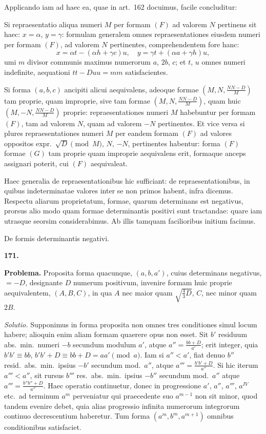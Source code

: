 \documentclass[12pt,a4paper]{article}
\theoremstyle{plain}
\begin{document}
Applicando iam ad haec ea, quae in art.~162 docuimus, facile concluditur:

Si repraesentatio aliqua numeri $M$ per formam $(F)$ ad valorem $N$ pertinens sit haec: $x = \alpha$, $y = \gamma$: formulam generalem omnes repraesentationes eiusdem numeri per formam $(F)$, ad valorem $N$ pertinentes, comprehendentem fore hanc:
\[
x = \alpha t - (\alpha h + \gamma c)u, \quad y = \gamma t + (\alpha a + \gamma h)u,
\]
umi $m$ divisor communis maximus numerorum $a$, $2b$, $c$; et $t$, $u$ omnes numeri indefinite, aequationi $tt - Duu = mm$ satisfacientes.

Si forma $(a,b,c)$ ancipiti alicui aequivalens, adeoque formae $(M,N,\frac{NN-D}{M})$ tam proprie, quam improprie, sive tam formae $(M,N,\frac{NN-D}{M})$, quam huic $(M,-N,\frac{NN-D}{M})$ proprie: repraesentationes numeri $M$ habebuntur per formam $(F)$, tam ad valorem $N$, quam ad valorem $-N$ pertinentes. Et vice versa si plures repraesentationes numeri $M$ per eandem formam $(F)$ ad valores oppositos expr.~$\sqrt{D} \pmod{M}$, $N$, $-N$, pertinentes habentur: forma $(F)$ formae $(G)$ tam proprie quam improprie aequivalens erit, formaque anceps assignari poterit, cui $(F)$ aequivaleat.

Haec generalia de repraesentationibus hic sufficiant: de repraesentationibus, in quibus indeterminatae valores inter se non primos habent, infra dicemus. Respectu aliarum proprietatum, formae, quarum determinans est negativus, prorsus alio modo quam formae determinantis positivi sunt tractandae: quare iam utrasque seorsim considerabimus. Ab illis tamquam facilioribus initium facimus.

\bigskip

\begin{center}
\Large De formis determinantis negativi.
\end{center}

\bigskip

\textbf{171.}

\textbf{Problema.} Proposita forma quacunque, $(a,b,a')$, cuius determinans negativus, $= -D$, designante $D$ numerum positivum, invenire formam huic proprie aequivalentem, $(A,B,C)$, in qua $A$ nec maior quam $\sqrt{\frac{4}{3}D}$, $C$, nec minor quam $2B$.

\textit{Solutio.} Supponimus in forma proposita non omnes tres conditiones simul locum habere; alioquin enim aliam formam quaerere opus non esset. Sit $b'$ residuum abs.~min.~numeri $-b$ secundum modulum $a'$, atque $a'' = \frac{bb+D}{a'}$; erit integer, quia $b'b' \equiv bb$, $b'b'+D \equiv bb+D = aa' \pmod{a}$. Iam si $a'' < a'$, fiat denuo $b''$ resid.~abs.~min.~ipsius $-b'$ secundum mod.~$a''$, atque $a''' = \frac{b'b'+D}{a''}$. Si hic iterum $a''' < a''$, sit rursus $b'''$ res.~abs.~min.~ipsius $-b''$ secundum mod.~$a''$ atque $a''' = \frac{b''b''+D}{a''}$. Haec operatio continuetur, donec in progressione $a'$, $a''$, $a'''$, $a^{IV}$ etc.~ad terminum $a^m$ perveniatur qui praecedente suo $a^{m-1}$ non sit minor, quod tandem evenire debet, quia alias progressio infinita numerorum integrorum continuo decrescentium haberetur. Tum forma $(a^m, b^m, a^{m+1})$ omnibus conditionibus satisfaciet.
\end{document}

